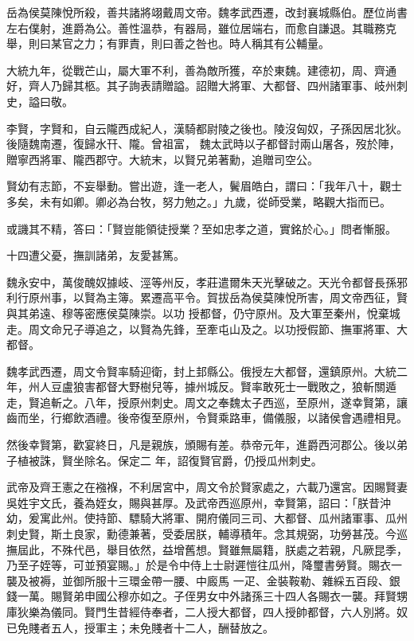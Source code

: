 \begin{pinyinscope}
 岳為侯莫陳悅所殺，善共諸將翊戴周文帝。魏孝武西遷，改封襄城縣伯。歷位尚書左右僕射，進爵為公。善性溫恭，有器局，雖位居端右，而愈自謙退。其職務克舉，則曰某官之力；有罪責，則曰善之咎也。時人稱其有公輔量。



 大統九年，從戰芒山，屬大軍不利，善為敵所獲，卒於東魏。建德初，周、齊通好，齊人乃歸其柩。其子詢表請贈謚。詔贈大將軍、大都督、四州諸軍事、岐州刺史，謚曰敬。



 李賢，字賢和，自云隴西成紀人，漢騎都尉陵之後也。陵沒匈奴，子孫因居北狄。後隨魏南遷，復歸水幵、隴。曾祖富，
 魏太武時以子都督討兩山屠各，歿於陣，贈寧西將軍、隴西郡守。大統末，以賢兄弟著勳，追贈司空公。



 賢幼有志節，不妄舉動。嘗出遊，逢一老人，鬢眉皓白，謂曰：「我年八十，觀士多矣，未有如卿。卿必為台牧，努力勉之。」九歲，從師受業，略觀大指而已。



 或譏其不精，答曰：「賢豈能領徒授業？至如忠孝之道，實銘於心。」問者慚服。



 十四遭父憂，撫訓諸弟，友愛甚篤。



 魏永安中，萬俊醜奴據岐、涇等州反，孝莊遣爾朱天光擊破之。天光令都督長孫邪利行原州事，以賢為主簿。累遷高平令。賀拔岳為侯莫陳悅所害，周文帝西征，賢與其弟遠、穆等密應侯莫陳崇。以功
 授都督，仍守原州。及大軍至秦州，悅棄城走。周文命兄子導追之，以賢為先鋒，至牽屯山及之。以功授假節、撫軍將軍、大都督。



 魏孝武西遷，周文令賢率騎迎衛，封上邽縣公。俄授左大都督，還鎮原州。大統二年，州人豆盧狼害都督大野樹兒等，據州城反。賢率敢死士一戰敗之，狼斬關遁走，賢追斬之。八年，授原州刺史。周文之奉魏太子西巡，至原州，遂幸賢第，讓齒而坐，行鄉飲酒禮。後帝復至原州，令賢乘路車，備儀服，以諸侯會遇禮相見。



 然後幸賢第，歡宴終日，凡是親族，頒賜有差。恭帝元年，進爵西河郡公。後以弟子植被誅，賢坐除名。保定二
 年，詔復賢官爵，仍授瓜州刺史。



 武帝及齊王憲之在襁褓，不利居宮中，周文令於賢家處之，六載乃還宮。因賜賢妻吳姓宇文氏，養為姪女，賜與甚厚。及武帝西巡原州，幸賢第，詔曰：「朕昔沖幼，爰寓此州。使持節、驃騎大將軍、開府儀同三司、大都督、瓜州諸軍事、瓜州刺史賢，斯土良家，勳德兼著，受委居朕，輔導積年。念其規弼，功勞甚茂。今巡撫屆此，不殊代邑，舉目依然，益增舊想。賢雖無屬籍，朕處之若親，凡厥昆季，乃至子姪等，可並預宴賜。」於是令中侍上士尉遲愷往瓜州，降璽書勞賢。賜衣一襲及被褥，並御所服十三環金帶一腰、中廄馬
 一疋、金裝鞍勒、雜綵五百段、銀錢一萬。賜賢弟申國公穆亦如之。子侄男女中外諸孫三十四人各賜衣一襲。拜賢甥庫狄樂為儀同。賢門生昔經侍奉者，二人授大都督，四人授帥都督，六人別將。奴已免賤者五人，授軍主；未免賤者十二人，酬替放之。




\end{pinyinscope}
